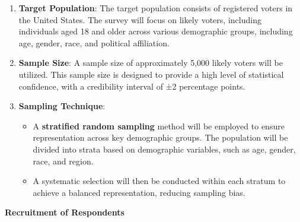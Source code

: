\documentclass[
  letterpaper,
  DIV=11,
  numbers=noendperiod]{scrartcl}
\begin{document}
\begin{enumerate}
\def\labelenumi{\arabic{enumi}.}
\item
  \textbf{Target Population}: The target population consists of
  registered voters in the United States. The survey will focus on
  likely voters, including individuals aged 18 and older across various
  demographic groups, including age, gender, race, and political
  affiliation.
\item
  \textbf{Sample Size}: A sample size of approximately 5,000 likely
  voters will be utilized. This sample size is designed to provide a
  high level of statistical confidence, with a credibility interval of
  ±2 percentage points.
\item
  \textbf{Sampling Technique}:

  \begin{itemize}
  \item
    A \textbf{stratified random sampling} method will be employed to
    ensure representation across key demographic groups. The population
    will be divided into strata based on demographic variables, such as
    age, gender, race, and region.
  \item
    A systematic selection will then be conducted within each stratum to
    achieve a balanced representation, reducing sampling bias.
  \end{itemize}
\end{enumerate}

\textbf{Recruitment of Respondents}
\end{document}
